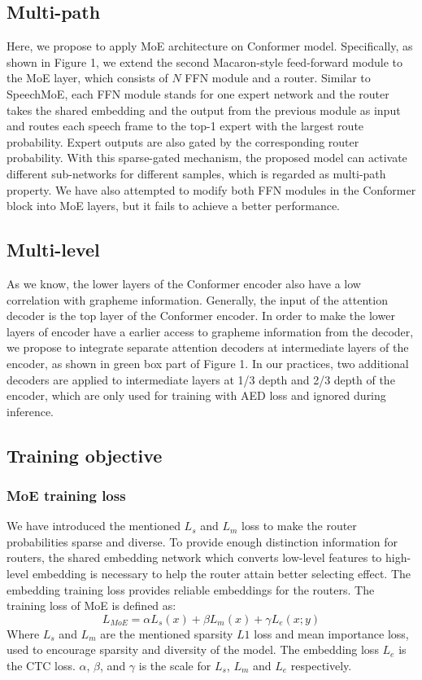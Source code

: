 \documentclass[a4paper]{article}
\begin{document}
\subsection{Multi-path}
Here, we propose to apply MoE architecture on Conformer model. Specifically, as shown in Figure 1, we extend the second Macaron-style feed-forward module to the MoE layer, which consists of $N$ FFN module and a router. Similar to SpeechMoE\cite{you2021speechmoe}, each FFN module stands for one expert network and the router takes the shared embedding and the output from the previous module as input and routes each speech frame to the top-1 expert with the largest route probability. Expert outputs are also gated by the corresponding router probability. With this sparse-gated mechanism, the proposed model can activate different sub-networks for different samples, which is regarded as multi-path property. We have also attempted to modify both FFN modules in the Conformer block into MoE layers, but it fails to achieve a better performance.



\subsection{Multi-level}
As we know, the lower layers of the Conformer encoder also have a low  correlation with grapheme information. Generally, the input of the attention decoder is the top layer of the Conformer encoder. In order to make the lower layers of encoder have a earlier access to grapheme information from the decoder, we propose to integrate separate attention decoders at intermediate layers of the encoder, as shown in green box part of Figure 1. In our practices, two additional decoders are applied to intermediate layers at 1/3 depth and 2/3 depth of the encoder, which are only used for training with AED loss and ignored during inference.




\subsection{ Training objective}
\subsubsection{ MoE training loss}
We have introduced the mentioned $L_{s}$ and $L_{m}$ loss to make the router probabilities sparse and diverse. To provide
enough distinction information for routers, the shared embedding network which converts low-level features to high-level
embedding is necessary to help the router attain better selecting effect.  The embedding training loss provides reliable embeddings for the routers. The training loss of MoE is defined as:
\begin{equation}
L_{MoE}=\alpha L_{s}(x) + \beta {L}_{m}(x) + \gamma  L_{e}(x;y)
\end{equation}
Where $L_{s}$ and ${L}_{m}$ are the mentioned sparsity $L1$ loss and mean importance loss, used to encourage sparsity and diversity of the model. The embedding loss $L_{e}$ is the CTC loss. $\alpha$, $\beta$, and $\gamma$ is the scale for $L_{s}$, ${L}_{m}$ and $L_{e}$ respectively.
\end{document}
